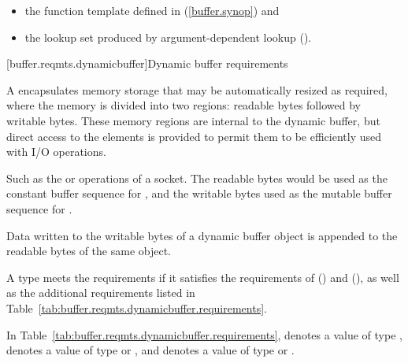 \begin{itemize}
\item the  function template defined in  (\ref{buffer.synop}) and
\item the lookup set produced by argument-dependent lookup ().
\end{itemize}


[buffer.reqmts.dynamicbuffer]{Dynamic buffer requirements}

\pnum
A  encapsulates memory storage that may be automatically resized as required, where the memory is divided into two regions: readable bytes followed by writable bytes. These memory regions are internal to the dynamic buffer, but direct access to the elements is provided to permit them to be efficiently used with I/O operations. \begin{note} Such as the  or  operations of a socket. The readable bytes would be used as the constant buffer sequence for , and the writable bytes used as the mutable buffer sequence for . \end{note} Data written to the writable bytes of a dynamic buffer object is appended to the readable bytes of the same object.

\pnum
A type  meets the  requirements if it satisfies the requirements of  () and  (), as well as the additional requirements listed in Table~\ref{tab:buffer.reqmts.dynamicbuffer.requirements}.

\pnum
In Table~\ref{tab:buffer.reqmts.dynamicbuffer.requirements},
 denotes a value of type ,
 denotes a value of type  or ,
and  denotes a value of type  or .

